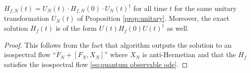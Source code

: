 \documentclass[final,leqno]{siamltex1213}
\DeclareMathOperator{\OdeSolve}{OdeSolve}
\begin{document}
\begin{proposition} \label{prop:isospectral}
$H_{f,N}(t) = U_{N}(t) \cdot H_{f,N}(0) \cdot U_{N}(t)^{\dagger}$ for all time $t$ for the same unitary transformation $U_{N}(t)$
of Proposition \ref{prop:unitary}.
Moreover, the exact solution $H_{f}(t)$ is of the form $U(t) H_{f}(0) U(t)^{\dagger}$ as well.
\end{proposition}
\begin{proof}
	This follows from the fact that algorithm outputs the solution to an isospectral flow ``$\dot{F}_{N} + [F_{N} , X_{N}]$''
	where $X_{N}$ is anti-Hermetian and that the $H_{f}$ satisfies the isospectral flow \eqref{eq:quantum observable ode}.
\end{proof}

%
%
\end{document}
